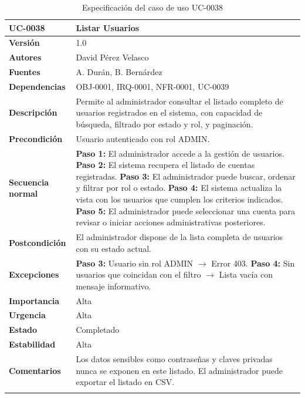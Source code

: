 \documentclass[11pt, a4paper]{article}
\begin{document}
\begin{longtable}{|p{4cm}|p{10cm}|}
\hline
\textbf{UC-0038} & Listar Usuarios \\
\hline
\textbf{Versión} & 1.0 \\
\hline
\textbf{Autores} & David Pérez Velasco \\
\hline
\textbf{Fuentes} & A. Durán, B. Bernárdez \\
\hline
\textbf{Dependencias} & OBJ-0001, IRQ-0001, NFR-0001, UC-0039 \\
\hline
\textbf{Descripción} & Permite al administrador consultar el listado completo de usuarios registrados en el sistema, con capacidad de búsqueda, filtrado por estado y rol, y paginación. \\
\hline
\textbf{Precondición} & Usuario autenticado con rol ADMIN. \\
\hline
\textbf{Secuencia normal} &
\textbf{Paso 1:} El administrador accede a la gestión de usuarios.\newline
\textbf{Paso 2:} El sistema recupera el listado de cuentas registradas.\newline
\textbf{Paso 3:} El administrador puede buscar, ordenar y filtrar por rol o estado.\newline
\textbf{Paso 4:} El sistema actualiza la vista con los usuarios que cumplen los criterios indicados.\newline
\textbf{Paso 5:} El administrador puede seleccionar una cuenta para revisar o iniciar acciones administrativas posteriores.\\
\hline
\textbf{Postcondición} & El administrador dispone de la lista completa de usuarios con su estado actual. \\
\hline
\textbf{Excepciones} &
\textbf{Paso 3:} Usuario sin rol ADMIN $\rightarrow$ Error 403.\newline
\textbf{Paso 4:} Sin usuarios que coincidan con el filtro $\rightarrow$ Lista vacía con mensaje informativo.\\
\hline
\textbf{Importancia} & Alta \\
\hline
\textbf{Urgencia} & Alta \\
\hline
\textbf{Estado} & Completado \\
\hline
\textbf{Estabilidad} & Alta \\
\hline
\textbf{Comentarios} & Los datos sensibles como contraseñas y claves privadas nunca se exponen en este listado. El administrador puede exportar el listado en CSV. \\
\hline
\caption{Especificación del caso de uso UC-0038}
\end{longtable}
\end{document}
